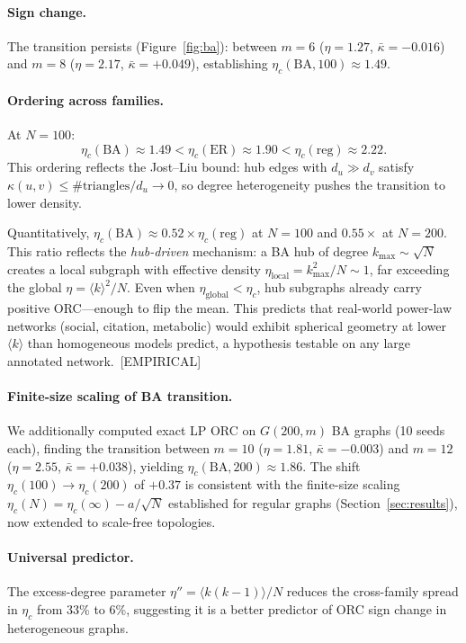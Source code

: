 \documentclass[11pt,a4paper]{article}
\newcommand{\etac}{\eta_c}
\begin{document}
\paragraph{Sign change.}
The transition persists (Figure~\ref{fig:ba}): between $m=6$
($\eta=1.27$, $\bar\kappa=-0.016$) and $m=8$ ($\eta=2.17$,
$\bar\kappa=+0.049$), establishing
$\etac(\mathrm{BA},100)\approx 1.49$.

\paragraph{Ordering across families.}
At $N=100$:
\begin{equation}
  \etac(\mathrm{BA})\approx 1.49 < \etac(\mathrm{ER})\approx 1.90 <
  \etac(\mathrm{reg})\approx 2.22.
\end{equation}
This ordering reflects the Jost--Liu bound: hub edges with
$d_u\gg d_v$ satisfy $\kappa(u,v)\leq\#\text{triangles}/d_u\to 0$,
so degree heterogeneity pushes the transition to lower density.

Quantitatively, $\etac(\mathrm{BA}) \approx 0.52 \times \etac(\mathrm{reg})$ at $N=100$ and $0.55 \times$ at $N=200$. This ratio reflects the \emph{hub-driven} mechanism: a BA hub of degree $k_{\max} \sim \sqrt{N}$ creates a local subgraph with effective density $\eta_{\mathrm{local}} = k_{\max}^2/N \sim 1$, far exceeding the global $\eta = \langle k\rangle^2/N$. Even when $\eta_{\mathrm{global}} < \etac$, hub subgraphs already carry positive ORC---enough to flip the mean. This predicts that real-world power-law networks (social, citation, metabolic) would exhibit spherical geometry at lower $\langle k\rangle$ than homogeneous models predict, a hypothesis testable on any large annotated network.~[EMPIRICAL]

\paragraph{Finite-size scaling of BA transition.}
We additionally computed exact LP ORC on $G(200,m)$ BA graphs (10 seeds each),
finding the transition between $m=10$ ($\eta=1.81$, $\bar\kappa=-0.003$) and
$m=12$ ($\eta=2.55$, $\bar\kappa=+0.038$), yielding
$\etac(\mathrm{BA},200)\approx 1.86$.
The shift $\etac(100)\to\etac(200)$ of $+0.37$ is consistent with the
finite-size scaling $\etac(N)=\etac(\infty)-a/\sqrt{N}$ established for
regular graphs (Section~\ref{sec:results}), now extended to scale-free topologies.

\paragraph{Universal predictor.}
The excess-degree parameter $\eta''=\langle k(k-1)\rangle/N$
reduces the cross-family spread in $\etac$ from 33\% to 6\%,
suggesting it is a better predictor of ORC sign change in
heterogeneous graphs.
\end{document}
